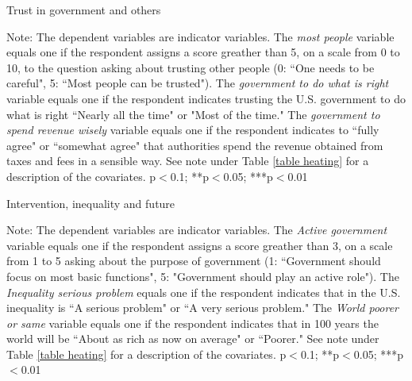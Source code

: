 \documentclass{article}
\begin{document}
\begin{table}[h!]
	\caption{Trust in government and others}
	\begin{center}
		\scalebox{0.7}{}
	\end{center}
	{\footnotesize Note: The dependent variables are indicator variables. The \textit{most people} variable equals one if the respondent assigns a score greather than 5, on a scale from 0 to 10, to the question asking about trusting other people (0: ``One needs to be careful", 5: ``Most people can be trusted"). The \textit{government to do what is right} variable equals one if the respondent indicates trusting the U.S. government to do what is right ``Nearly all the time" or "Most of the time." The \textit{government to spend revenue wisely} variable equals one if the respondent indicates to ``fully agree" or ``somewhat agree" that authorities spend the revenue obtained from taxes and fees in a sensible way.
	See note under Table \ref{table heating} for a description of the covariates.
		\newline *p$<$0.1; **p$<$0.05; ***p$<$0.01}	
\end{table}	

\begin{table}[h!]
	\caption{Intervention, inequality and future}
	\begin{center}
		\scalebox{0.7}{}
	\end{center}
	{\footnotesize Note: The dependent variables are indicator variables. The \textit{Active government} variable equals one if the respondent assigns a score greather than 3, on a scale from 1 to 5 asking about the purpose of government (1: ``Government should focus on most basic functions", 5: "Government should play an active role"). The \textit{Inequality serious problem} equals one if the respondent indicates that in the U.S. inequality is ``A serious problem" or ``A very serious problem." The \textit{World poorer or same} variable equals one if the respondent indicates that in 100 years the world will be ``About as rich as now on average" or ``Poorer."
	See note under Table \ref{table heating} for a description of the covariates.
	\newline *p$<$0.1; **p$<$0.05; ***p$<$0.01}
\end{table}	
\end{document}
